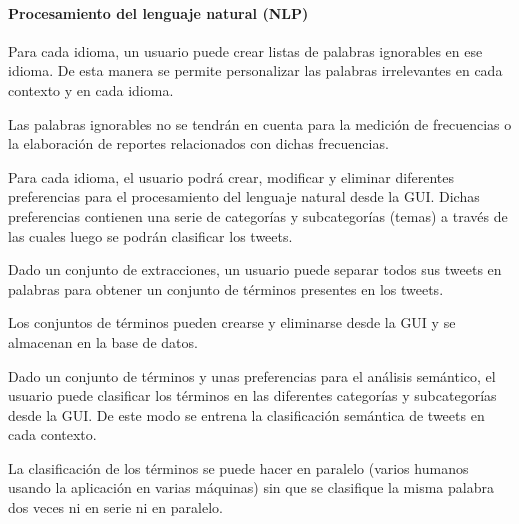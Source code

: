\begin{functional}
\paragraph{Procesamiento del lenguaje natural (NLP)}
\item Para cada idioma, un usuario puede crear listas de palabras ignorables en ese idioma. De esta manera se permite personalizar las palabras irrelevantes en cada contexto y en cada idioma.
\item Las palabras ignorables no se tendrán en cuenta para la medición de frecuencias o la elaboración de reportes relacionados con dichas frecuencias.
\item Para cada idioma, el usuario podrá crear, modificar y eliminar diferentes preferencias para el procesamiento del lenguaje natural desde la GUI. Dichas preferencias contienen una serie de categorías y subcategorías (temas) a través de las cuales luego se podrán clasificar los tweets.
\item Dado un conjunto de extracciones, un usuario puede separar todos sus tweets en palabras para obtener un conjunto de términos presentes en los tweets.
\item Los conjuntos de términos pueden crearse y eliminarse desde la GUI y se almacenan en la base de datos.
\item Dado un conjunto de términos y unas preferencias para el análisis semántico, el usuario puede clasificar los términos en las diferentes categorías y subcategorías desde la GUI. De este modo se entrena la clasificación semántica de tweets en cada contexto.
\item La clasificación de los términos se puede hacer en paralelo (varios humanos usando la aplicación en varias máquinas) sin que se clasifique la misma palabra dos veces ni en serie ni en paralelo.


\end{functional}
\newpage